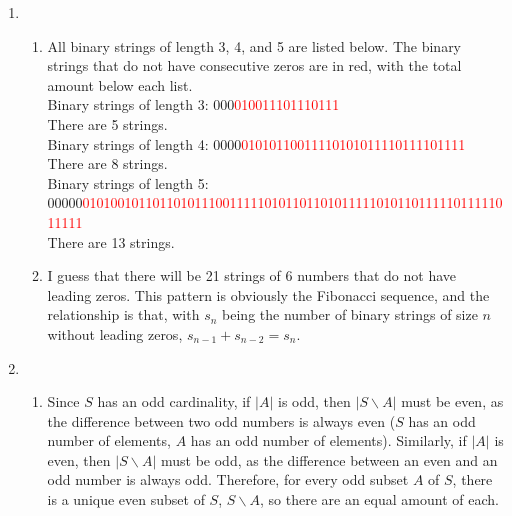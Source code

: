 \documentclass[10pt,english]{article}
\begin{document}
\begin{enumerate}
 
\item \begin{enumerate}
    \item All binary strings of length 3, 4, and 5 are listed below. The binary strings that do not have consecutive zeros are in red, with the total amount below each list. 
\\Binary strings of length 3: 000\quad\textcolor{Red}{010}\quad\textcolor{Red}{011}\quad\textcolor{Red}{101}\quad\textcolor{Red}{110}\quad\textcolor{Red}{111}
\\There are 5 strings.
\\Binary strings of length 4: 0000\quad\textcolor{Red}{0101}\quad\textcolor{Red}{0110}\quad\textcolor{Red}{0111}\quad\textcolor{Red}{1010}\quad\textcolor{Red}{1011}\quad\textcolor{Red}{1101}\quad\textcolor{Red}{1110}\quad\textcolor{Red}{1111}
\\There are 8 strings.
\\Binary strings of length 5: 00000\quad\textcolor{Red}{01010}\quad\textcolor{Red}{01011}\quad\textcolor{Red}{01101}\quad\textcolor{Red}{01110}\quad\textcolor{Red}{01111}\quad\textcolor{Red}{10101}\quad\textcolor{Red}{10110}\quad\textcolor{Red}{10111}\quad\textcolor{Red}{11010}\quad\textcolor{Red}{11011}\quad\textcolor{Red}{11101}\quad\textcolor{Red}{11110}\quad\textcolor{Red}{11111}
\\There are 13 strings. 

\item I guess that there will be 21 strings of 6 numbers that do not have leading zeros. This pattern is obviously the Fibonacci sequence, and the relationship is that, with $s_n$ being the number of binary strings of size $n$ without leading zeros, $s_{n-1}+s_{n-2}=s_n$. \pagebreak
\end{enumerate}

\item \begin{enumerate}
    \item Since $S$ has an odd cardinality, if $|A|$ is odd, then $|S\backslash A|$ must be even, as the difference between two odd numbers is always even ($S$ has an odd number of elements, $A$ has an odd number of elements). Similarly, if $|A|$ is even, then $|S\backslash A|$ must be odd, as the difference between an even and an odd number is always odd. Therefore, for every odd subset $A$ of $S$, there is a unique even subset of $S$, $S\backslash A$, so there are an equal amount of each.  
    

\end{enumerate}
\end{enumerate}
\end{document}
